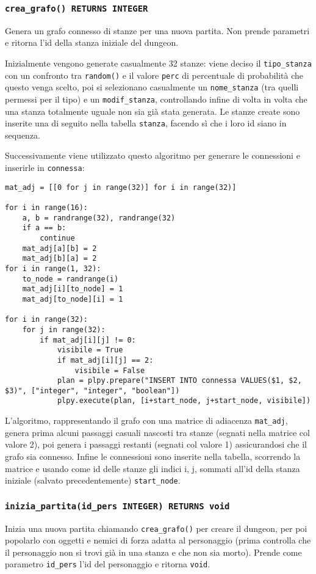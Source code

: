\documentclass[10pt,a4paper]{article}
\begin{document}
\subsubsection{\texttt{crea\_grafo() RETURNS INTEGER}}
Genera un grafo connesso di stanze per una nuova partita. Non prende parametri e ritorna l'id della stanza iniziale del dungeon.

Inizialmente vengono generate casualmente 32 stanze: viene deciso il \texttt{tipo\_stanza} con un confronto tra \texttt{random()} e il valore \texttt{perc} di percentuale di probabilità che questo venga scelto, poi si selezionano casualmente un \texttt{nome\_stanza} (tra quelli permessi per il tipo) e un \texttt{modif\_stanza}, controllando infine di volta in volta che una stanza totalmente uguale non sia già stata generata. Le stanze create sono inserite una di seguito nella tabella \texttt{stanza}, facendo sì che i loro id siano in sequenza.

Successivamente viene utilizzato questo algoritmo per generare  le connessioni e inserirle in \texttt{connessa}:
\begin{lstlisting}
mat_adj = [[0 for j in range(32)] for i in range(32)]

for i in range(16):
    a, b = randrange(32), randrange(32)
    if a == b:
        continue
    mat_adj[a][b] = 2
    mat_adj[b][a] = 2
for i in range(1, 32):
    to_node = randrange(i)
    mat_adj[i][to_node] = 1
    mat_adj[to_node][i] = 1

for i in range(32):
    for j in range(32):
        if mat_adj[i][j] != 0:
            visibile = True
            if mat_adj[i][j] == 2:
                visibile = False
            plan = plpy.prepare("INSERT INTO connessa VALUES($1, $2, $3)", ["integer", "integer", "boolean"])
            plpy.execute(plan, [i+start_node, j+start_node, visibile])
\end{lstlisting}
L'algoritmo, rappresentando il grafo con una matrice di adiacenza \texttt{mat\_adj}, genera prima alcuni passaggi casuali nascosti tra stanze (segnati nella matrice col valore 2), poi genera i passaggi restanti (segnati col valore 1) assicurandosi che il grafo sia connesso. Infine le connessioni sono inserite nella tabella, scorrendo la matrice e usando come id delle stanze gli indici i, j, sommati all'id della stanza iniziale (salvato precedentemente) \texttt{start\_node}.

\subsubsection{\texttt{inizia\_partita(id\_pers INTEGER) RETURNS void}}
Inizia una nuova partita chiamando \texttt{crea\_grafo()} per creare il dungeon, per poi popolarlo con oggetti e nemici di forza adatta al personaggio (prima controlla che il personaggio non si trovi già in una stanza e che non sia morto). Prende come parametro \texttt{id\_pers} l'id del personaggio e ritorna \texttt{void}.
\end{document}
